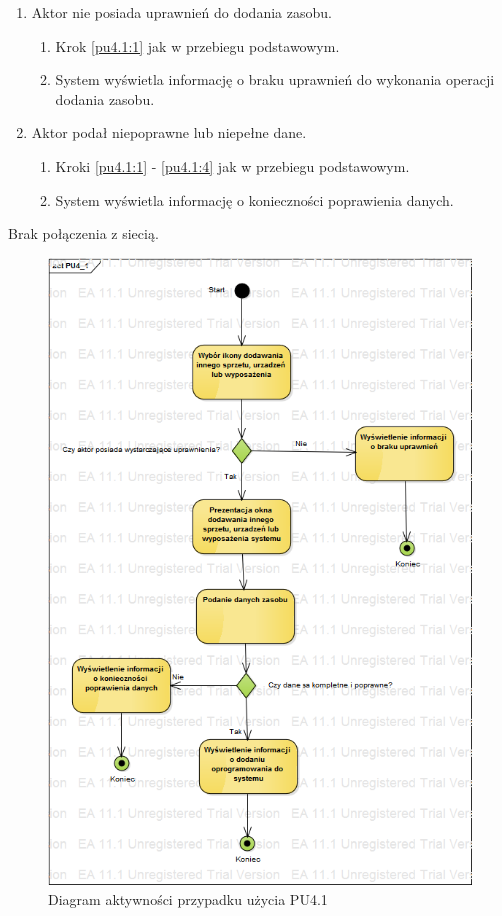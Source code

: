 \begin{enumerate}
\item Aktor nie posiada uprawnień do dodania zasobu.
	\begin{enumerate}[label*=\arabic*.]
		\item Krok \ref{pu4.1:1} jak w przebiegu podstawowym.
		\item System wyświetla informację o braku uprawnień do wykonania operacji dodania zasobu.
	\end{enumerate}
\item Aktor podał niepoprawne lub niepełne dane.
	\begin{enumerate}[label*=\arabic*.]
		\item Kroki \ref{pu4.1:1} - \ref{pu4.1:4} jak w przebiegu podstawowym.
		\item System wyświetla informację o konieczności poprawienia danych.
	\end{enumerate}
\end{enumerate}

Brak połączenia z siecią.

\begin{figure}[h!]
	\centering
	\includegraphics[scale=0.6]{img/diagrams/activityDiagrams/PU4_1}
	\caption{Diagram aktywności przypadku użycia PU4.1 \label{fig:labelADPU4.1}}
\end{figure}

